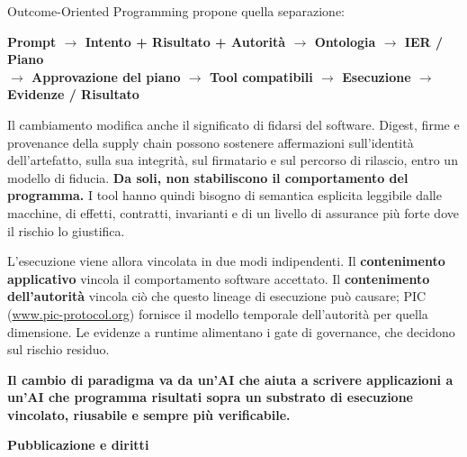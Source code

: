 \documentclass[10pt,oneside,openany]{book}
\begin{document}
{Outcome-Oriented Programming propone quella separazione:

\begin{center}
\sffamily\bfseries\footnotesize
Prompt $\rightarrow$ Intento + Risultato + Autorità $\rightarrow$ Ontologia $\rightarrow$ IER / Piano\\
$\rightarrow$ Approvazione del piano $\rightarrow$ Tool compatibili $\rightarrow$ Esecuzione $\rightarrow$ Evidenze / Risultato
\end{center}

Il cambiamento modifica anche il significato di fidarsi del software. Digest, firme e provenance della supply chain possono sostenere affermazioni sull'identità dell'artefatto, sulla sua integrità, sul firmatario e sul percorso di rilascio, entro un modello di fiducia. \textbf{Da soli, non stabiliscono il comportamento del programma.} I tool hanno quindi bisogno di semantica esplicita leggibile dalle macchine, di effetti, contratti, invarianti e di un livello di assurance più forte dove il rischio lo giustifica.

L'esecuzione viene allora vincolata in due modi indipendenti. Il \textbf{contenimento applicativo} vincola il comportamento software accettato. Il \textbf{contenimento dell'autorità} vincola ciò che questo lineage di esecuzione può causare; PIC (\url{www.pic-protocol.org}) fornisce il modello temporale dell'autorità per quella dimensione. Le evidenze a runtime alimentano i gate di governance, che decidono sul rischio residuo.

\textbf{Il cambio di paradigma va da un'AI che aiuta a scrivere applicazioni a un'AI che programma risultati sopra un substrato di esecuzione vincolato, riusabile e sempre più verificabile.}
}

\vfill
\clearpage
\pagestyle{fancy}

\thispagestyle{empty}
\vspace*{0.02in}
{\sffamily\bfseries\Large Pubblicazione e diritti\par}
\vspace{0.08in}
\end{document}
